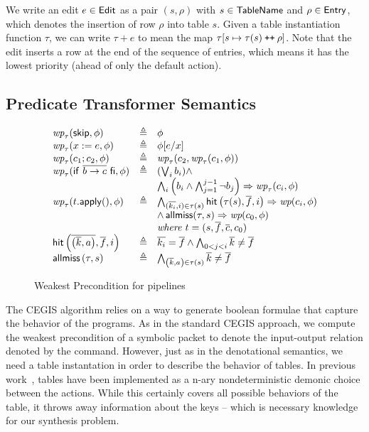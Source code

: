 We write an edit $e \in \mathsf{Edit}$ as a pair $(s, \rho)$ with
$s \in \mathsf{TableName}$ and $\rho \in \mathsf{Entry}$, which denotes the insertion
of row $\rho$ into table $s$. Given a table instantiation function
$\tau$, we can write $\tau + e$ to mean the map
$\tau[s \mapsto \tau(s) \mathbin{\texttt{++}} \rho]$. Note that the edit inserts a
row at the end of the sequence of entries, which means it has the
lowest priority (ahead of only the default action).


\subsection{Predicate Transformer Semantics}

\begin{figure}
  \[
    \begin{array}{lcl}
      \mathop{\textit{wp}}_\tau(\mathsf{skip},\phi)
      & \triangleq
      & \phi \\
      \mathop{\textit{wp}}_\tau(x := e, \phi)
      & \triangleq
      & \phi[e/x]\\
      \mathop{\textit{wp}}_\tau(c_1;c_2, \phi)
      & \triangleq
      & \mathop{\textit{wp}}_\tau(c_2, \mathop{\textit{wp}}_\tau(c_1, \phi)) \\
      \mathop{\textit{wp}}_\tau(\mathsf{if}~\overline{b \to c}~\mathsf{fi}, \phi)
      & \triangleq
      & (\bigvee_i b_i) \wedge \\
      && \bigwedge_i\left(b_i \wedge \bigwedge_{j=1}^{j-1}\neg b_j\right) \Rightarrow \mathop{\textit{wp}}_\tau(c_i, \phi)\\
      \mathop{\textit{wp}}_\tau(t.\mathsf{apply}(), \phi)
      &\triangleq
      &  \bigwedge_{(\overline{k_i}, i) \in \tau(s)}\mathop{\textsf{hit}}\left(\tau(s), \overline f, i\right)\Rightarrow \mathop{\textit{wp}}(c_i,\phi) \\
      && \wedge \mathop{\textsf{allmiss}}(\tau,s) \Rightarrow \mathop{\textit{wp}}(c_0, \phi) \\
      && \textit{where } t = (s, \overline f, \overline c, c_0) \\
      \mathop{\textsf{hit}}\left(\overline{\left(\overline{k}, a\right)},\overline f, i\right)
      &\triangleq& \overline{k_i} = \overline f \wedge \bigwedge_{0<j<i} \overline k \neq \overline f\\
      \mathop{\textsf{allmiss}}\left(\tau,s\right) &\triangleq& \bigwedge_{\left(\overline k, a\right) \in \tau(s)} \overline k \neq \overline f
    \end{array}
  \]
  \caption{Weakest Precondition for pipelines}
  \label{fig:table-wp}
\end{figure}

The CEGIS algorithm relies on a way to generate boolean formulae that
capture the behavior of the programs. As in the standard CEGIS
approach, we compute the weakest precondition of a symbolic packet to
denote the input-output relation denoted by the command. However, just
as in the denotational semantics, we need a table instantation in
order to describe the behavior of tables. In previous work~\cite{pv4},
tables have been implemented as a n-ary nondeterministic demonic
choice between the actions. While this certainly covers all possible
behaviors of the table, it throws away information about the keys --
which is necessary knowledge for our synthesis problem.

